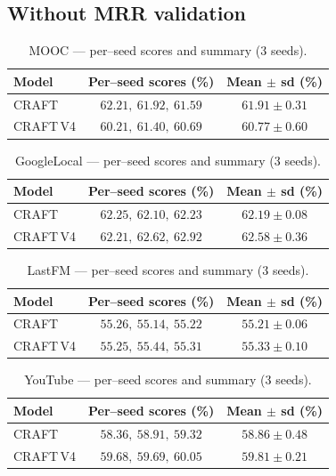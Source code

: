 \documentclass[11pt]{article}
\begin{document}
\FloatBarrier

\subsection{Without MRR validation}

\begin{table}[H]
\centering
\caption{MOOC --- per--seed scores and summary (3 seeds).}
\begin{tabular}{lcc}
\toprule
Model & Per--seed scores (\%) & Mean $\pm$ sd (\%) \\
\midrule
CRAFT      & $62.21,\ 61.92,\ 61.59$ & $\mathbf{61.91 \pm 0.31}$ \\
CRAFT\,V4  & $60.21,\ 61.40,\ 60.69$ & $60.77 \pm 0.60$ \\
\bottomrule
\end{tabular}
\end{table}

\begin{table}[H]
\centering
\caption{GoogleLocal --- per--seed scores and summary (3 seeds).}
\begin{tabular}{lcc}
\toprule
Model & Per--seed scores (\%) & Mean $\pm$ sd (\%) \\
\midrule
CRAFT      & $62.25,\ 62.10,\ 62.23$ & $62.19 \pm 0.08$ \\
CRAFT\,V4  & $62.21,\ 62.62,\ 62.92$ & $\mathbf{62.58 \pm 0.36}$ \\
\bottomrule
\end{tabular}
\end{table}

\begin{table}[H]
\centering
\caption{LastFM --- per--seed scores and summary (3 seeds).}
\begin{tabular}{lcc}
\toprule
Model & Per--seed scores (\%) & Mean $\pm$ sd (\%) \\
\midrule
CRAFT      & $55.26,\ 55.14,\ 55.22$ & $55.21 \pm 0.06$ \\
CRAFT\,V4  & $55.25,\ 55.44,\ 55.31$ & $\mathbf{55.33 \pm 0.10}$ \\
\bottomrule
\end{tabular}
\end{table}

\begin{table}[H]
\centering
\caption{YouTube --- per--seed scores and summary (3 seeds).}
\begin{tabular}{lcc}
\toprule
Model & Per--seed scores (\%) & Mean $\pm$ sd (\%) \\
\midrule
CRAFT      & $58.36,\ 58.91,\ 59.32$ & $58.86 \pm 0.48$ \\
CRAFT\,V4  & $59.68,\ 59.69,\ 60.05$ & $\mathbf{59.81 \pm 0.21}$ \\
\bottomrule
\end{tabular}
\end{table}
\end{document}
